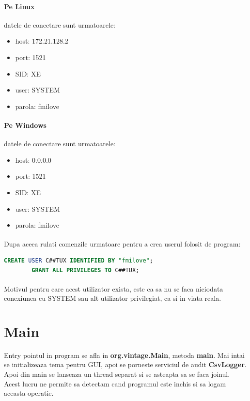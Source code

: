 \documentclass[oneside]{article}
\begin{document}
\paragraph{Pe Linux} datele de conectare sunt urmatoarele:
\begin{itemize}
    \item host: 172.21.128.2
    \item port: 1521
    \item SID: XE
    \item user: SYSTEM
    \item parola: fmilove
\end{itemize}

\paragraph{Pe Windows} datele de conectare sunt urmatoarele:
\begin{itemize}
    \item host: 0.0.0.0
    \item port: 1521
    \item SID: XE
    \item user: SYSTEM
    \item parola: fmilove
\end{itemize}

\paragraph{}Dupa aceea rulati comenzile urmatoare pentru a crea userul folosit de program:

\begin{center}
    \begin{lstlisting}[language=sql]
        CREATE USER C##TUX IDENTIFIED BY "fmilove";
        GRANT ALL PRIVILEGES TO C##TUX;
    \end{lstlisting}
\end{center}

\paragraph{} Motivul pentru care acest utilizator exista, este ca sa nu se faca niciodata conexiunea cu SYSTEM sau alt utilizator privilegiat, ca si in viata reala.

\section[Main]{Main}
\paragraph{}Entry pointul in program se afla in \textbf{org.vintage.Main}, metoda \textbf{main}. Mai intai se initializeaza tema pentru GUI, apoi se porneste serviciul de audit \textbf{CsvLogger}. Apoi din main se lanseaza un thread separat si se asteapta sa se faca joinul. Acest lucru ne permite sa detectam cand programul este inchis si sa logam aceasta operatie. 
\end{document}
